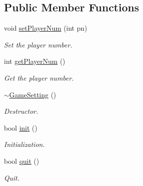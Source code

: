 \subsection*{Public Member Functions}
\begin{DoxyCompactItemize}
\item 
\mbox{\label{class_game_setting_a722c66a1fdf37f4d47896e90ae9fbb31}} 
void \mbox{\hyperlink{class_game_setting_a722c66a1fdf37f4d47896e90ae9fbb31}{set\+Player\+Num}} (int pn)
\begin{DoxyCompactList}\small\item\em Set the player number. \end{DoxyCompactList}\item 
\mbox{\label{class_game_setting_aa6dc71890e4cbe1e832787f295a423bf}} 
int \mbox{\hyperlink{class_game_setting_aa6dc71890e4cbe1e832787f295a423bf}{get\+Player\+Num}} ()
\begin{DoxyCompactList}\small\item\em Get the player number. \end{DoxyCompactList}\item 
\mbox{\label{class_game_setting_acdd67d6db676b7f76a02f17df9f90a6c}} 
\mbox{\hyperlink{class_game_setting_acdd67d6db676b7f76a02f17df9f90a6c}{$\sim$\+Game\+Setting}} ()
\begin{DoxyCompactList}\small\item\em Destructor. \end{DoxyCompactList}\item 
\mbox{\label{class_game_setting_a22af786e2e4ed1871a1687431ee48a33}} 
bool \mbox{\hyperlink{class_game_setting_a22af786e2e4ed1871a1687431ee48a33}{init}} ()
\begin{DoxyCompactList}\small\item\em Initialization. \end{DoxyCompactList}\item 
\mbox{\label{class_game_setting_a2adf267a364c37da0a9393f99d69027f}} 
bool \mbox{\hyperlink{class_game_setting_a2adf267a364c37da0a9393f99d69027f}{quit}} ()
\begin{DoxyCompactList}\small\item\em Quit. \end{DoxyCompactList}\item 

\end{DoxyCompactItemize}
